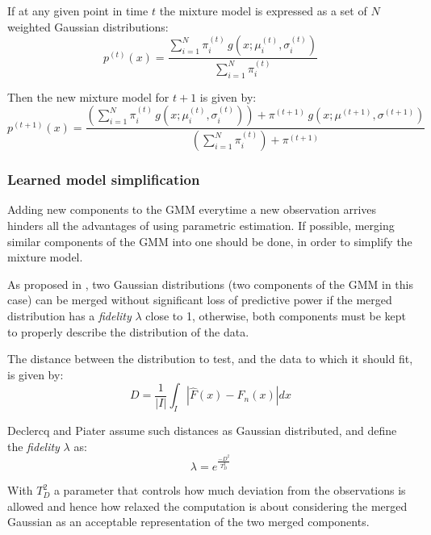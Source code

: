 	If at any given point in time $t$ the mixture model is expressed as a set of $N$ weighted
	Gaussian distributions:
	\begin{equation}
		p^{(t)}(x) =
			\frac
			{\sum_{i=1}^N \pi_i^{(t)}\,g(x; \mu_i^{(t)}, \sigma_i^{(t)})}
			{\sum_{i=1}^N \pi_i^{(t)}}
	\end{equation}

	Then the new mixture model for $t+1$ is given by:
	\begin{equation}
		\label{eq:merge_gaussians}
		p^{(t+1)}(x) =
		\frac
		{\left( \sum_{i=1}^N \pi_i^{(t)} \, g(x; \mu_i^{(t)}, \sigma_i^{(t)}) \right) +
		\pi^{(t+1)} \, g(x; \mu^{(t+1)}, \sigma^{(t+1)})}
		{\left(\sum_{i=1}^N \pi_i^{(t)} \right) + \pi^{(t+1)}}
	\end{equation}

	\subsubsection{Learned model simplification}
	Adding new components to the GMM everytime a new observation arrives hinders all the advantages
	of using parametric estimation. If possible, merging similar components of the GMM into one
	should be done, in order to simplify the mixture model.

	As proposed in \cite{declercq2008online}, two Gaussian distributions (two components of the GMM in
	this case) can be merged without significant loss of predictive power if the merged distribution
	has a \emph{fidelity} $\lambda$ close to 1, otherwise, both components must be kept to
	properly describe the distribution of the data.

	The distance between the distribution to test, and the data to which it should fit, is given by:
	\begin{equation}
		D = \frac 1 {|I|} \int_I \left| \hat{F}(x) - F_n(x)\right| dx
	\end{equation}

	Declercq and Piater assume such distances as Gaussian distributed, and define the
	\emph{fidelity} $\lambda$ as:
	\begin{equation}
		\lambda = e^{\frac{-D^2}{T_D^2}}
	\end{equation}

	With $T_D^2$ a parameter that controls how much deviation from the observations is allowed and
	hence how relaxed the computation is about considering the merged Gaussian as an acceptable
	representation of the two merged components.


